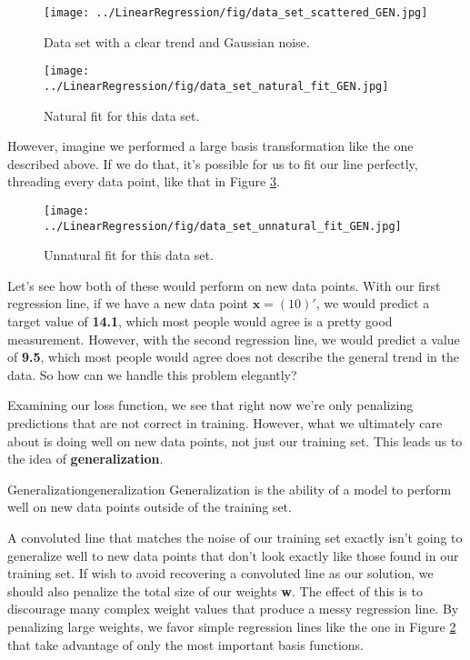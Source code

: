 \begin{figure}
    \centering
    \texttt{[image: ../LinearRegression/fig/data\_set\_scattered\_GEN.jpg]}
    \caption{Data set with a clear trend and Gaussian noise.}
    \label{fig:data-set-scattered}
\end{figure}

\begin{figure}
    \centering
    \texttt{[image: ../LinearRegression/fig/data\_set\_natural\_fit\_GEN.jpg]}
    \caption{Natural fit for this data set.}
    \label{fig:data-set-natural-fit}
\end{figure}

However, imagine we performed a large basis transformation like the one described above. If we do that, it's possible for us to fit our line perfectly, threading every data point, like that in Figure \ref{fig:data-set-unnatural-fit}.

\begin{figure}
    \centering
    \texttt{[image: ../LinearRegression/fig/data\_set\_unnatural\_fit\_GEN.jpg]}
    \caption{Unnatural fit for this data set.}
    \label{fig:data-set-unnatural-fit}
\end{figure}

Let's see how both of these would perform on new data points. With our first regression line, if we have a new data point $\textbf{x} = (10)'$, we would predict a target value of \textbf{14.1}, which most people would agree is a pretty good measurement. However, with the second regression line, we would predict a value of \textbf{9.5}, which most people would agree does not describe the general trend in the data. So how can we handle this problem elegantly?

Examining our loss function, we see that right now we're only penalizing predictions that are not correct in training. However, what we ultimately care about is doing well on new data points, not just our training set. This leads us to the idea of \textbf{generalization}.

\begin{definition}{Generalization}{generalization}
    Generalization is the ability of a model to perform well on new data points outside of the training set.
\end{definition}

A convoluted line that matches the noise of our training set exactly isn't going to generalize well to new data points that don't look exactly like those found in our training set. If wish to avoid recovering a convoluted line as our solution, we should also penalize the total size of our weights \textbf{w}. The effect of this is to discourage many complex weight values that produce a messy regression line. By penalizing large weights, we favor simple regression lines like the one in Figure \ref{fig:data-set-natural-fit} that take advantage of only the most important basis functions.

